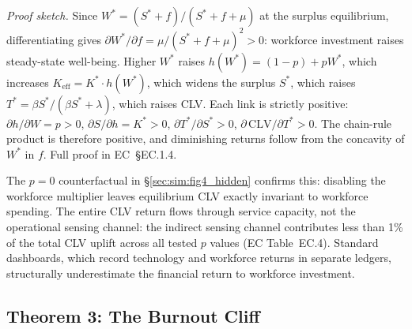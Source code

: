 \documentclass[msom,dblanonrev]{informs4}
\newcommand{\Keff}{K_{\mathrm{eff}}}
\begin{document}
\noindent\textit{Proof sketch.}
Since $W^* = (S^* + f)/(S^* + f + \mu)$ at the surplus equilibrium, differentiating gives $\partial W^*/\partial f = \mu/(S^* + f + \mu)^2 > 0$: workforce investment raises steady-state well-being. Higher $W^*$ raises $h(W^*) = (1-p) + pW^*$, which increases $\Keff = K^* \cdot h(W^*)$, which widens the surplus $S^*$, which raises $T^* = \beta S^*/(\beta S^* + \lambda)$, which raises CLV. Each link is strictly positive: $\partial h/\partial W = p > 0$, $\partial S/\partial h = K^* > 0$, $\partial T^*/\partial S^* > 0$, $\partial\,\mathrm{CLV}/\partial T^* > 0$. The chain-rule product is therefore positive, and diminishing returns follow from the concavity of $W^*$ in $f$. Full proof in EC~\S EC.1.4. \Halmos

\medskip
The $p{=}0$ counterfactual in \S\ref{sec:sim:fig4_hidden} confirms this: disabling the workforce multiplier leaves equilibrium CLV exactly invariant to workforce spending. The entire CLV return flows through service capacity, not the operational sensing channel: the indirect sensing channel contributes less than 1\% of the total CLV uplift across all tested $p$ values (EC Table~EC.4). Standard dashboards, which record technology and workforce returns in separate ledgers, structurally underestimate the financial return to workforce investment.

\subsection{Theorem 3: The Burnout Cliff}\label{sec:analysis:cliff}
\end{document}
